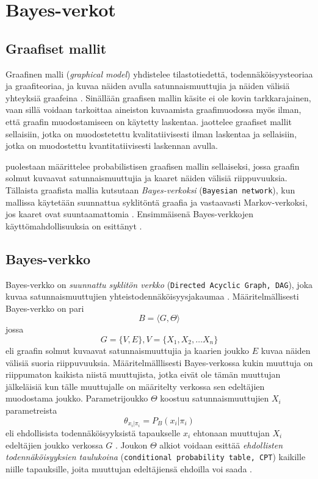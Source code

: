 \chapter{Bayes-verkot\label{bayes}}

\section{Graafiset mallit}
Graafinen malli (\emph{graphical model}) yhdistelee tilastotiedettä, todennäköisyysteoriaa ja graafiteoriaa, ja kuvaa näiden avulla satunnaismuuttujia ja näiden välisiä yhteyksiä graafeina \citep{jordan_graphical_2004}. Sinällään graafisen mallin käsite ei ole kovin tarkkarajainen, vaan sillä voidaan tarkoittaa aineiston kuvaamista graafimuodossa myös ilman, että graafin muodostamiseen on käytetty laskentaa. \citet{ramsahai_connecting_2020} jaottelee graafiset mallit sellaisiin, jotka on muodostetettu kvalitatiivisesti ilman laskentaa ja sellaisiin, jotka on muodostettu kvantitatiivisesti laskennan avulla. 

\citet{jordan_graphical_2004} puolestaan määrittelee probabilistisen graafisen mallin sellaiseksi, jossa graafin solmut kuvaavat satunnaismuuttujia ja kaaret näiden välisiä riippuvuuksia. Tällaista graafista mallia kutsutaan \emph{Bayes-verkoksi} (\texttt{Bayesian network}), kun mallissa käytetään suunnattua syklitöntä graafia ja vastaavasti Markov-verkoksi, jos kaaret ovat suuntaamattomia \citep{ruggeri_bayesian_2008}. Ensimmäisenä Bayes-verkkojen käyttömahdollisuuksia on esittänyt \citet{pearl1986fusion}.

\section{Bayes-verkko}
Bayes-verkko on \emph{suunnattu syklitön verkko} (\texttt{Directed Acyclic Graph, DAG}), joka kuvaa satunnaismuuttujien yhteistodennäköisyysjakaumaa \citep{ruggeri_bayesian_2008}. Määritelmällisesti Bayes-verkko on pari 
$$
    B = \langle G, \Theta \rangle
$$
jossa 
$$
    G = \{V, E\}, V = \{X_1, X_2,\ldots X_n\}
$$ 
eli graafin solmut kuvaavat satunnaismuuttujia ja kaarien joukko $E$ kuvaa näiden välisiä suoria riippuvuuksia. Määritelmälllisesti Bayes-verkossa kukin muuttuja on riippumaton kaikista niistä muuttujista, jotka eivät ole tämän muuttujan jälkeläisiä kun tälle muuttujalle on määritelty verkossa sen edeltäjien muodostama joukko. Parametrijoukko $\Theta$ koostuu satunnaismuuttujien $X_i$ parametreista 
$$
    \theta_{x_i|\pi_i} = P_B(x_i|\pi_i)
$$ 
eli ehdollisista todennäköisyyksistä tapaukselle $x_i$ ehtonaan muuttujan $X_i$ edeltäjien joukko verkossa $G$ \citep{ruggeri_bayesian_2008, myllymaki_bayes-verkkojen_1998}. Joukon $\Theta$ alkiot voidaan esittää \emph{ehdollisten todennäköisyyksien taulukoina}  (\texttt{conditional probability table, CPT}) kaikille niille tapauksille, joita muuttujan edeltäjiensä ehdoilla voi saada \citep{zhang_brief_2019}.

